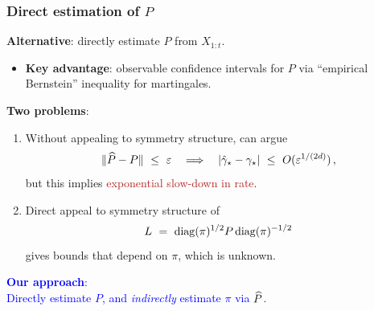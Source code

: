\documentclass[11pt,compress,blue4,notheorems]{beamer}
\newcommand{\BLUE}[1]{\textcolor{blue}{#1}}
\newcommand{\FIREBRICK}[1]{\textcolor{firebrick}{#1}}
\newcommand\gap{\ensuremath{\gamma_{\star}}}
\newcommand\hatgap{\ensuremath{\hat{\gamma}_{\star}}}
\begin{document}
\begin{frame}
  \frametitle{Direct estimation of $P$}

  \textbf{Alternative}: directly estimate $P$ from $X_{1:t}$.

  \begin{itemize}
    \item<2->
      \textbf{Key advantage}: observable confidence intervals for $P$
      via ``empirical Bernstein'' inequality for martingales.

  \end{itemize}

  \textbf{Two problems}:
  \begin{enumerate}
    \item<4->
      Without appealing to symmetry structure, can argue
      \[
        \norm{\wh{P} - P} \ \leq \ \veps
        \quad\Longrightarrow\quad
        \abs{\hatgap - \gap} \ \leq \ O(\veps^{1/(2d)})
        \,,
      \]
      but this implies \FIREBRICK{exponential slow-down in rate}.

      \medskip

    \item<5->
      Direct appeal to symmetry structure of
      \[
        L \ = \ \operatorname{diag}(\pi)^{1/2} P \operatorname{diag}(\pi)^{-1/2}
      \]
      gives bounds that depend on $\pi$, which is unknown.

  \end{enumerate}

  \begin{center}
    \BLUE{%
      \textbf{Our approach}: \\
      Directly estimate $P$, and \emph{indirectly} estimate $\pi$ via
      $\widehat P$.
    }
  \end{center}

\end{frame}

\end{document}
